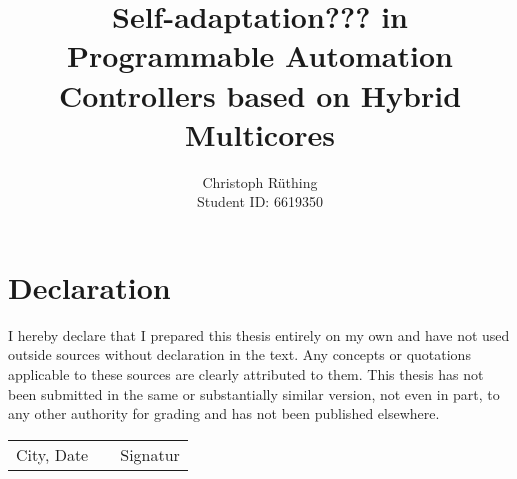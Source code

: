 \documentclass[
	a4paper,
	11pt,
	twoside,
	DIV=12,
	BCOR=15mm,
	abstracton,
	parskip,
	listof=totoc,
	bibliography=totoc]{scrreprt}
\begin{document}

\subject{
	Master Thesis}
\title{
	Self-adaptation??? in Programmable Automation Controllers based on Hybrid
	Multicores}
\author{
	Christoph Rüthing\\[-12pt]
	Student ID: 6619350}
\publishers{
	{\large Supervisors}\\[12pt]
	Prof. Dr. Marco Platzner\\
	Dipl.-Inf. Andreas Agne}
\lowertitleback{
	Master Thesis\\
	\textbf{
		Self-adaptation in Programmable Automation Controller\\
		based on Hybrid Multicores}\\[.5cm]
	University of Paderborn\\
	Faculty of Electrical Engineering, Computer Science and Mathematics\\
	Department of Computer Science\\
	Warburger Str. 100\\
	33098 Paderborn}

\maketitle

\cleardoublepage



\chapter*{Declaration}

I hereby declare that I prepared this thesis entirely on my own and have not
used outside sources without declaration in the text. Any concepts or
quotations applicable to these sources are clearly attributed to them. This
thesis has not been submitted in the same or substantially similar version,
not even in part, to any other authority for grading and has not been
published elsewhere.\\[27pt]

\begin{center}
	\begin{tabular}{l p{} r}
		\cline{1-1}\cline{3-3}
		\begin{minipage}[t]{0.4\textwidth}
			\centering
			City, Date
		\end{minipage}
		&
		\begin{minipage}[t]{0.2\textwidth}
		\end{minipage}
		&
		\begin{minipage}[t]{0.4\textwidth}
  			\centering
  			Signatur
		\end{minipage}
	\end{tabular}
\end{center}
\end{document}
